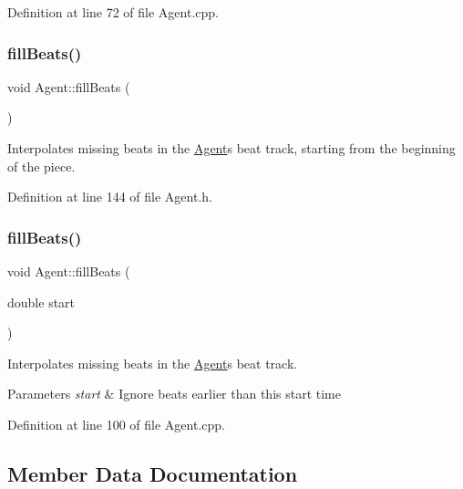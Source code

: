 Definition at line 72 of file Agent.\+cpp.

\mbox{\label{class_agent_a0b45b44b745b3234c117d356de7b299c}} 
\subsubsection{\texorpdfstring{fill\+Beats()}{fillBeats()}\hspace{0.1cm}{\footnotesize\ttfamily [1/2]}}
{\footnotesize\ttfamily void Agent\+::fill\+Beats (\begin{DoxyParamCaption}{ }\end{DoxyParamCaption})\hspace{0.3cm}{\ttfamily [inline]}}

Interpolates missing beats in the \hyperlink{class_agent}{Agent}\textquotesingle{}s beat track, starting from the beginning of the piece. 

Definition at line 144 of file Agent.\+h.

\mbox{\label{class_agent_a1eedd701cb0b8551d6642afb710ba2a1}} 
\subsubsection{\texorpdfstring{fill\+Beats()}{fillBeats()}\hspace{0.1cm}{\footnotesize\ttfamily [2/2]}}
{\footnotesize\ttfamily void Agent\+::fill\+Beats (\begin{DoxyParamCaption}\item[{double}]{start }\end{DoxyParamCaption})}

Interpolates missing beats in the \hyperlink{class_agent}{Agent}\textquotesingle{}s beat track. 
\begin{DoxyParams}{Parameters}
{\em start} & Ignore beats earlier than this start time \\
\hline
\end{DoxyParams}


Definition at line 100 of file Agent.\+cpp.



\subsection{Member Data Documentation}
\mbox{\label{class_agent_abafab4395f0ebf00ca08cdffe8a87705}} 
